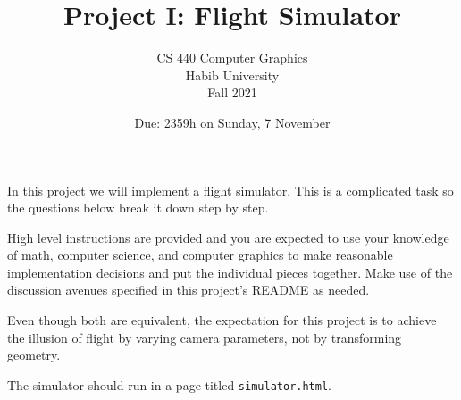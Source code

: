 \documentclass[addpoints]{exam}
\title{Project I: Flight Simulator}
\author{CS 440 Computer Graphics\\Habib University\\Fall 2021}
\date{Due: 2359h on Sunday, 7 November}
\begin{document}
\maketitle
\thispagestyle{empty}

In this project we will implement a flight simulator. This is a complicated task so the questions below break it down step by step.

High level instructions are provided and you are expected to use your knowledge of math, computer science, and computer graphics to make reasonable implementation decisions and put the individual pieces together. Make use of the discussion avenues specified in this project's README as needed.

Even though both are equivalent, the expectation for this project is to achieve the illusion of flight by varying camera parameters, not by transforming geometry.

The simulator should run in a page titled \texttt{simulator.html}.
\end{document}
